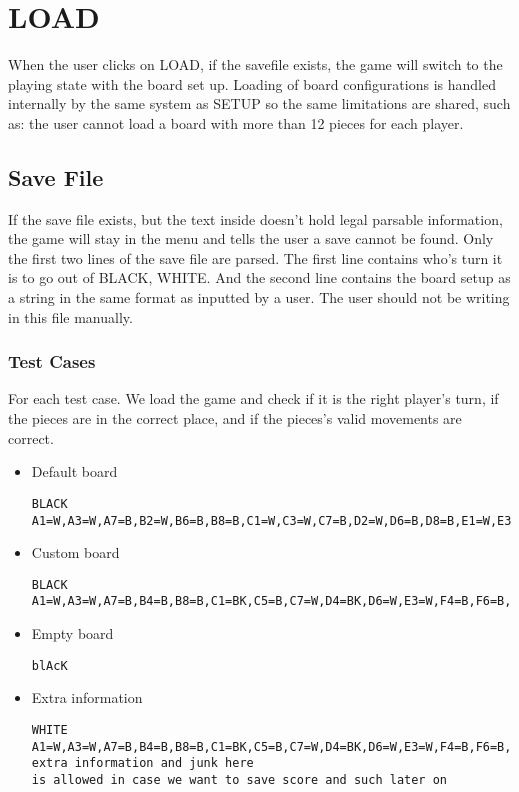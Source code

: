 \documentclass{article}
\begin{document}
\section{LOAD} \label{a2:s:load}
When the user clicks on LOAD, if the savefile exists, the game will switch to the playing state with the board set up.
Loading of board configurations is handled internally by the same system as SETUP so the same limitations are shared,
such as: the user cannot load a board with more than 12 pieces for each player.

\subsection{Save File}
If the save file exists, but the text inside doesn't hold legal parsable information, the game will stay in the menu and tells the user a save cannot be found.
Only the first two lines of the save file are parsed. The first line contains who's turn it is to go out of {BLACK, WHITE}.
And the second line contains the board setup as a string in the same format as inputted by a user.
The user should not be writing in this file manually.

\subsubsection*{Test Cases}
For each test case.
We load the game and check if it is the right player's turn, if the pieces are in the correct place, and if the pieces's valid movements are correct.

\begin{itemize}
\item Default board\hfill
\begin{lstlisting}
BLACK
A1=W,A3=W,A7=B,B2=W,B6=B,B8=B,C1=W,C3=W,C7=B,D2=W,D6=B,D8=B,E1=W,E3=W,E7=B,F2=W,F6=B,F8=B,G1=W,G3=W,G7=B,H2=W,H6=B,H8=B"
\end{lstlisting}

\item Custom board\hfill 
\begin{lstlisting}
BLACK
A1=W,A3=W,A7=B,B4=B,B8=B,C1=BK,C5=B,C7=W,D4=BK,D6=W,E3=W,F4=B,F6=B,F8=WK,G1=W,G3=W,G5=W,G7=WK,H6=B
\end{lstlisting}

\item Empty board\hfill 
\begin{lstlisting}
blAcK

\end{lstlisting}

\item Extra information\hfill 
\begin{lstlisting}
WHITE
A1=W,A3=W,A7=B,B4=B,B8=B,C1=BK,C5=B,C7=W,D4=BK,D6=W,E3=W,F4=B,F6=B,F8=WK,G1=W,G3=W,G5=W,G7=WK,H6=B
extra information and junk here
is allowed in case we want to save score and such later on

\end{lstlisting}
\end{itemize}
\end{document}
